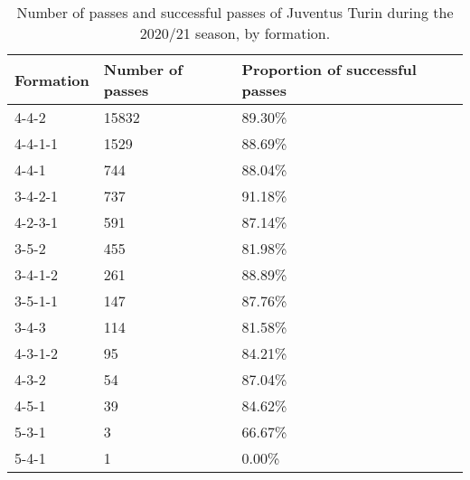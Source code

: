 \begin{table}[!htbp]
\centering
\caption{Number of passes and successful passes of Juventus Turin during the 2020/21 season,
by formation.}\s

\begin{tabular}{@{}lll@{}}
   \hline
Formation & Number of passes & Proportion of successful passes \\ \midrule
4-4-2          & 15832       & 89.30\% \\
4-4-1-1        & 1529        & 88.69\% \\
4-4-1          & 744         & 88.04\% \\
3-4-2-1        & 737         & 91.18\% \\
4-2-3-1        & 591         & 87.14\% \\
3-5-2          & 455         & 81.98\% \\
3-4-1-2        & 261         & 88.89\% \\
3-5-1-1        & 147         & 87.76\% \\
3-4-3          & 114         & 81.58\% \\
4-3-1-2        & 95          & 84.21\% \\
4-3-2          & 54          & 87.04\% \\
4-5-1          & 39          & 84.62\% \\
5-3-1          & 3           & 66.67\% \\
5-4-1          & 1           & 0.00\%  \\ \bottomrule
\end{tabular}

\label{tab:formation_juventus}
\end{table}
